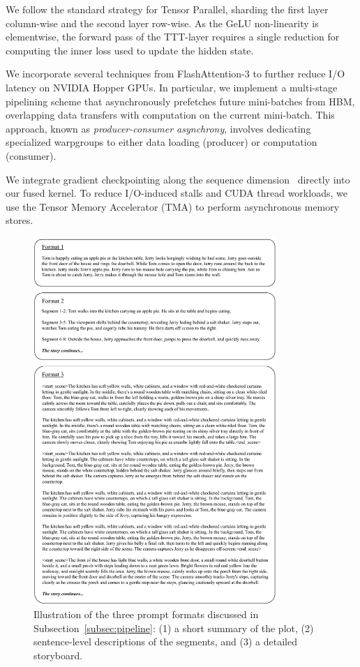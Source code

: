 \vspace{0.75em}  We follow the standard strategy for Tensor Parallel, sharding the first layer column-wise and the second layer row-wise. As the GeLU non-linearity is elementwise, the forward pass of the TTT-layer requires a single reduction for computing the inner loss used to update the hidden state.

 We incorporate several techniques from FlashAttention-3 \cite{shah2024flashattention3fastaccurateattention} to further reduce I/O latency on NVIDIA Hopper GPUs. In particular, we implement a multi-stage pipelining scheme that asynchronously prefetches future mini-batches from HBM, overlapping data transfers with computation on the current mini-batch. This approach, known as \textit{producer-consumer asynchrony}, involves dedicating specialized warpgroups to either data loading (producer) or computation (consumer).

We integrate gradient checkpointing along the sequence dimension~\cite{sun2024ttt} directly into our fused kernel. To reduce I/O-induced stalls and CUDA thread workloads, we use the Tensor Memory Accelerator (TMA) to perform asynchronous memory stores.

\begin{figure}[!t]
    \centering
    \includegraphics[width=0.82\textwidth]{figs/prompt.pdf}
    \caption{Illustration of the three prompt formats discussed in Subsection~\ref{subsec:pipeline}: (1) a short summary of the plot, (2) sentence-level descriptions of the segments, and (3) a detailed storyboard.}
    \label{fig:prompts}
\end{figure}